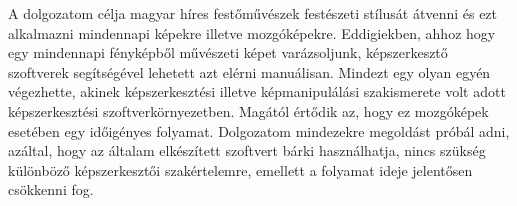\documentclass[12pt, a4paper, oneside]{book}
\theoremstyle{tetel}
\begin{document}
\newline
\indent
A dolgozatom célja magyar híres festőművészek festészeti stílusát átvenni és ezt alkalmazni mindennapi képekre illetve mozgóképekre. Eddigiekben, ahhoz hogy egy mindennapi fényképből művészeti képet varázsoljunk, képszerkesztő szoftverek segítségével lehetett azt elérni manuálisan. Mindezt egy olyan egyén végezhette, akinek képszerkesztési illetve képmanipulálási szakismerete volt adott képszerkesztési szoftverkörnyezetben. Magától értődik az, hogy ez mozgóképek esetében egy időigényes folyamat. Dolgozatom mindezekre megoldást próbál adni, azáltal, hogy az általam elkészített szoftvert bárki használhatja, nincs szükség különböző képszerkesztői szakértelemre, emellett a folyamat ideje jelentősen csökkenni fog. 

\end{document}
